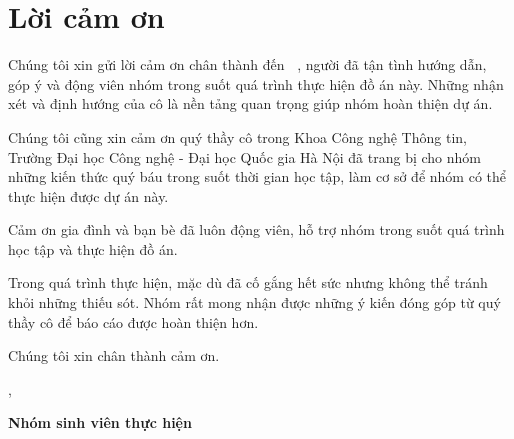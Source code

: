 
\chapter*{Lời cảm ơn}

\vspace{1cm}

Chúng tôi xin gửi lời cảm ơn chân thành đến \textbf{\supervisortitle~\supervisor}, người đã tận tình hướng dẫn, góp ý và động viên nhóm trong suốt quá trình thực hiện đồ án này. Những nhận xét và định hướng của cô là nền tảng quan trọng giúp nhóm hoàn thiện dự án.

Chúng tôi cũng xin cảm ơn quý thầy cô trong Khoa Công nghệ Thông tin, Trường Đại học Công nghệ - Đại học Quốc gia Hà Nội đã trang bị cho nhóm những kiến thức quý báu trong suốt thời gian học tập, làm cơ sở để nhóm có thể thực hiện được dự án này.

Cảm ơn gia đình và bạn bè đã luôn động viên, hỗ trợ nhóm trong suốt quá trình học tập và thực hiện đồ án.

Trong quá trình thực hiện, mặc dù đã cố gắng hết sức nhưng không thể tránh khỏi những thiếu sót. Nhóm rất mong nhận được những ý kiến đóng góp từ quý thầy cô để báo cáo được hoàn thiện hơn.

Chúng tôi xin chân thành cảm ơn.

\vspace{1.5cm}

\begin{flushright}
    \location, \reportyear

    \textbf{Nhóm sinh viên thực hiện}
\end{flushright}

\newpage
